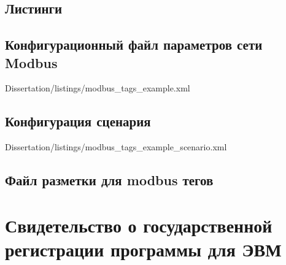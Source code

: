 \begin{landscape}
\chapter{Листинги}

\section{Конфигурационный файл параметров сети Modbus}\label{app:sec:modbus_tag}
\begin{landscape}
    
            {Dissertation/listings/modbus_tags_example.xml}
\end{landscape}

\section{Конфигурация сценария}\label{app:sec:modbus_scenario_example_diagram}

        {Dissertation/listings/modbus_tags_example_scenario.xml}

\section{Файл разметки для modbus тегов}

% 

% 
        

\end{landscape}

\chapter{Свидетельство о государственной регистрации программы для ЭВМ}\label{ch:app1}

